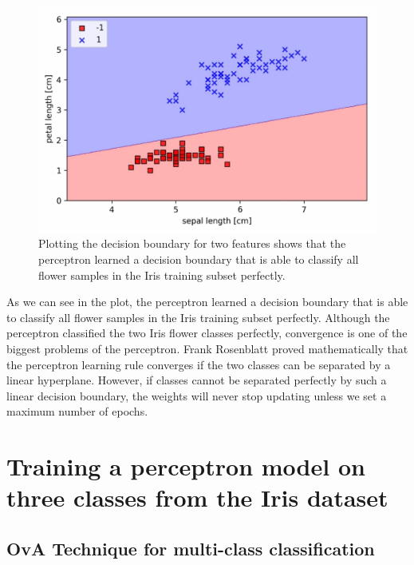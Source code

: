 \documentclass[11pt]{article}
\begin{document}
    \begin{figure}[hbt!]
        \centering
        \includegraphics[width=1\linewidth,trim=4 4 4 4,clip]{img/perc_2class_dec_bound.png}
        \caption{Plotting the decision boundary for two features shows that the perceptron learned a decision boundary that is able to classify all flower samples in the Iris training subset perfectly.}
        \label{fig:perc_2class_dec_bound}
    \end{figure}

    As we can see in the plot, the perceptron learned a decision boundary that is able to classify all flower samples in the Iris training subset perfectly.
    Although the perceptron classified the two Iris flower classes perfectly, convergence is one of the biggest problems of the perceptron.
    Frank Rosenblatt proved mathematically that the perceptron learning rule converges if the two classes can be separated by a linear hyperplane.
    However, if classes cannot be separated perfectly by such a linear decision boundary, the weights will never stop updating unless we set a maximum number of epochs.

    \section{Training a perceptron model on three classes from the Iris dataset} \label{sec:perc_preproc}

    \subsection{OvA Technique for multi-class classification} \label{subsec:perc_ova}
\end{document}

